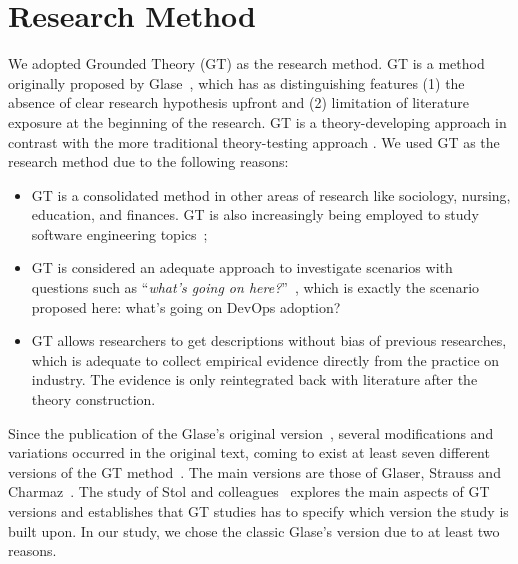 \section{Research Method} \label{sec:research_method}

We adopted Grounded Theory (GT) as the research method. GT is a method originally
proposed by Glase~\cite{glase1967discovery}, which has as distinguishing features (1) the
absence of clear research hypothesis upfront and (2) limitation of literature
exposure at the beginning of the research. GT is a theory-developing approach in
contrast with the more traditional theory-testing approach
\cite{coleman2007using}.
We used GT as the research method due to the following reasons:



\begin{itemize}

\item GT is a consolidated method in other areas of research like sociology,
nursing, education, and finances. GT is also increasingly being employed
to study software engineering topics~\cite{Hoda:2017:ICSE,stol2016grounded,Waterman:2015:ICSE};

\item GT is considered an adequate approach to investigate scenarios with
questions such as ``\textit{what's going on here?}''~\cite{barnsteiner2002using},
which is exactly the scenario proposed here: what's going on DevOps adoption?

\item GT allows researchers to get descriptions without bias of previous
researches, which is adequate to collect empirical evidence directly from the
practice on industry. The evidence is only reintegrated back with literature
after the theory construction.

\end{itemize}

Since the publication of the Glase's original version~\cite{glase1967discovery},
several modifications and variations occurred in the original text, coming to
exist at least seven different versions of the GT method~\cite{denzin2007grounded}.
The main versions are those of Glaser, Strauss and
Charmaz~\cite{stol2016grounded}. The study of Stol and colleagues~\cite{stol2016grounded}
explores the main aspects of GT versions and establishes that GT studies has to
specify which version the study is built upon. In our study, we chose the classic
Glase's version due to at least two reasons.


